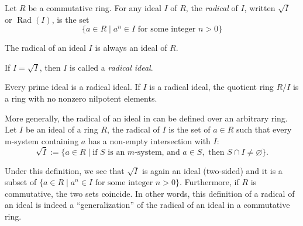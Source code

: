 \documentclass[12pt]{article}
\begin{document}
Let $R$ be a commutative ring.  For any ideal $I$ of $R$, the {\em radical} of $I$, written $\sqrt{I}$ or $\operatorname{Rad}(I)$, is the set 
\[ \{a \in R \mid a^n \in I \text{ for some integer } n>0 \}\]

The radical of an ideal $I$ is always an ideal of $R$.

If $I = \sqrt{I}$, then $I$ is called a {\em radical ideal}.

Every prime ideal is a radical ideal.  If $I$ is a radical ideal, the quotient ring $R/I$ is a ring with no nonzero nilpotent elements.

More generally, the radical of an ideal in can be defined over an arbitrary ring.  Let $I$ be an ideal of a ring $R$, the radical of $I$ is the set of $a\in R$ such that every m-system containing $a$ has a non-empty intersection with $I$: $$\sqrt{I}:=\lbrace a\in R\mid \mbox{if }S\mbox{ is an $m$-system, and }a\in S,\mbox{ then }S\cap I\ne \varnothing\rbrace.$$

Under this definition, we see that $\sqrt{I}$ is again an ideal (two-sided) and it is a subset of $\lbrace a\in R\mid a^n\in I \mbox{ for some integer }n>0\rbrace$.  Furthermore, if $R$ is commutative, the two sets coincide.  In other words, this definition of a radical of an ideal is indeed a ``generalization'' of the radical of an ideal in a commutative ring.
\end{document}
